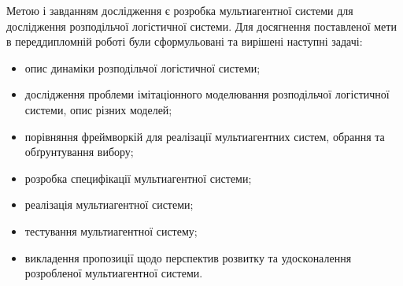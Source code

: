 Метою і завданням дослідження є розробка мультиагентної системи для дослідження розподільчої логістичної системи.
Для досягнення поставленої мети в переддипломній роботі були сформульовані та вирішені наступні задачі:
\begin{itemize}
	\item опис динаміки розподільчої логістичної системи;
	\item дослідження проблеми імітаціонного моделювання розподільчої логістичної системи, опис різних моделей;
	\item порівняння фреймворкій для реалізації мультиагентних систем, обрання та обґрунтування вибору;
	\item розробка специфікації мультиагентної системи;
	\item реалізація мультиагентної системи;
	\item тестування мультиагентної систему;
	\item викладення пропозиції щодо перспектив розвитку та удосконалення розробленої мультиагентної системи.
\end{itemize}
